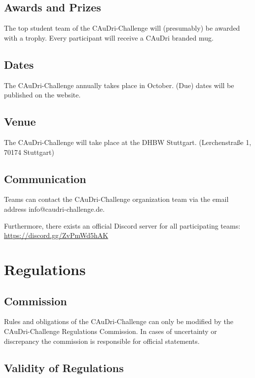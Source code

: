 \documentclass[a4paper]{report}
\begin{document}
\section{Awards and Prizes}

The top student team of the CAuDri-Challenge will (presumably) be awarded with a trophy. 
Every participant will receive a CAuDri branded mug.
\section{Dates}

The CAuDri-Challenge annually takes place in October. (Due) dates will be published on the website. 

\section{Venue}

The CAuDri-Challenge will take place at the DHBW Stuttgart. (Lerchenstraße 1, 70174 Stuttgart) 

\section{Communication}

Teams can contact the CAuDri-Challenge organization team via the email address info@caudri-challenge.de. 

Furthermore, there exists an official Discord server for all participating teams:\\ \href{https://discord.gg/ZvPmWd5hAK}{https://discord.gg/ZvPmWd5hAK} 

\chapter{Regulations}

\section{Commission}

Rules and obligations of the CAuDri-Challenge can only be modified by the CAuDri-Challenge Regulations Commission. In cases of uncertainty or discrepancy the commission is responsible for official statements. 

\section{Validity of Regulations}
\end{document}
